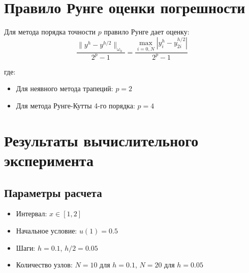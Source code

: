 \documentclass[12pt,a4paper]{article}
\begin{document}
\section{Правило Рунге оценки погрешности}
Для метода порядка точности $p$ правило Рунге дает оценку:
\begin{equation*}
\frac{\|y^h - y^{h/2}\|_{\omega_h}}{2^p - 1} = \frac{\max_{i=\overline{0,N}} |y_i^h - y_{2i}^{h/2}|}{2^p - 1}
\end{equation*}

где:
\begin{itemize}
\item Для неявного метода трапеций: $p = 2$
\item Для метода Рунге-Кутты 4-го порядка: $p = 4$
\end{itemize}

\section{Результаты вычислительного эксперимента}

\subsection{Параметры расчета}
\begin{itemize}
\item Интервал: $x \in [1, 2]$
\item Начальное условие: $u(1) = 0.5$
\item Шаги: $h = 0.1$, $h/2 = 0.05$
\item Количество узлов: $N = 10$ для $h = 0.1$, $N = 20$ для $h = 0.05$
\end{itemize}
\end{document}
